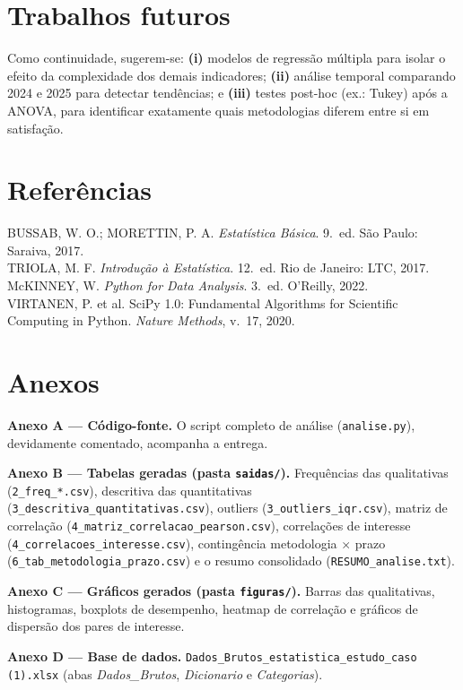 \documentclass[a4paper, 12pt]{article}
\newcommand{\var}[1]{\texttt{#1}}
\begin{document}
\section{Trabalhos futuros}

Como continuidade, sugerem-se: \textbf{(i)} modelos de regressão múltipla para
isolar o efeito da complexidade dos demais indicadores; \textbf{(ii)} análise
temporal comparando 2024 e 2025 para detectar tendências; e \textbf{(iii)} testes
post-hoc (ex.: Tukey) após a ANOVA, para identificar exatamente quais metodologias
diferem entre si em satisfação.

\section*{Referências}
\footnotesize{
\noindent BUSSAB, W. O.; MORETTIN, P. A. \emph{Estatística Básica}. 9.\ ed. São Paulo: Saraiva, 2017.\\[4pt]
\noindent TRIOLA, M. F. \emph{Introdução à Estatística}. 12.\ ed. Rio de Janeiro: LTC, 2017.\\[4pt]
\noindent McKINNEY, W. \emph{Python for Data Analysis}. 3.\ ed. O'Reilly, 2022.\\[4pt]
\noindent VIRTANEN, P. et al. SciPy 1.0: Fundamental Algorithms for Scientific Computing in Python. \emph{Nature Methods}, v.\ 17, 2020.\\
}

\newpage
{}
\section*{Anexos}

\textbf{Anexo A --- Código-fonte.} O script completo de análise
(\var{analise.py}), devidamente comentado, acompanha a entrega.

\textbf{Anexo B --- Tabelas geradas (pasta \var{saidas/}).} Frequências das
qualitativas (\var{2\_freq\_*.csv}), descritiva das quantitativas
(\var{3\_descritiva\_quantitativas.csv}), outliers (\var{3\_outliers\_iqr.csv}),
matriz de correlação (\var{4\_matriz\_correlacao\_pearson.csv}), correlações de
interesse (\var{4\_correlacoes\_interesse.csv}), contingência metodologia
$\times$ prazo (\var{6\_tab\_metodologia\_prazo.csv}) e o resumo consolidado
(\var{RESUMO\_analise.txt}).

\textbf{Anexo C --- Gráficos gerados (pasta \var{figuras/}).} Barras das
qualitativas, histogramas, boxplots de desempenho, heatmap de correlação e
gráficos de dispersão dos pares de interesse.

\textbf{Anexo D --- Base de dados.} \var{Dados\_Brutos\_estatistica\_estudo\_caso
(1).xlsx} (abas \emph{Dados\_Brutos}, \emph{Dicionario} e \emph{Categorias}).
\end{document}
